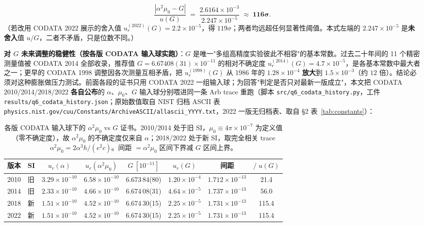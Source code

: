 \documentclass[12pt,a4paper]{article}
\begin{document}
\begin{equation}
  \frac{|\alpha^2\mu_0 - G|}{u(G)} \;=\; \frac{2.6164\times10^{-3}}{2.247\times10^{-5}} \;\approx\; \mathbf{116\sigma}.
\end{equation}
（若改用 CODATA 2022 展示的舍入值 $u_r^{(2022)}(G)=2.2\times10^{-5}$，得 $119\sigma$；两者均远超任何显著性阈值。本式左端的 $2.247\times10^{-5}$ 是\textbf{未舍入}值 $u/G$，二者不矛盾，只是位数不同。）

\textbf{对 $G$ 未来调整的稳健性（按各版 CODATA 输入球实跑）}：$G$ 是唯一"多组高精度实验彼此不相容"的基本常数。过去二十年间的 11 个精密测量值被 CODATA 2014 全部收录，推荐值 $G = 6.67408(31)\times10^{-11}$ 的相对不确定度 $u_r^{(2014)}(G) = 4.7\times10^{-5}$，是各基本常数中最大者之一\cite{li2020g}；更早的 CODATA 1998 调整因各次测量互相矛盾，把 $u_r^{(1998)}(G)$ 从 1986 年的 $1.28\times10^{-4}$ \textbf{放大}到 $1.5\times10^{-3}$（约 $12$ 倍）\cite{codata1998}。结论必须对这种膨胀做压力测试。前面各段的证书只用 CODATA 2022 一组输入球；为回答"判定是否只对最新一版成立"，本文把 CODATA 2010/2014/2018/2022 \textbf{各自公布}的 $\alpha$、$\mu_0$、$G$ 输入球分别喂进同一条 Arb trace 重跑（脚本 \texttt{src/q6\_\allowbreak{}codata\_\allowbreak{}history.py}，工件 \texttt{results/q6\_\allowbreak{}codata\_\allowbreak{}history.json}；原始数值取自 NIST 归档 ASCII 表 \texttt{physics.nist.gov/cuu/Constants/ArchiveASCII/allascii\_\allowbreak{}YYYY.txt}，2022 一版无归档表、取自 §2 表~\ref{tab:constants}）：

\begin{table}[h]
\centering
\caption{各版 CODATA 输入球下的 $\alpha^2\mu_0$ vs $G$ 证书。2010/2014 处于旧 SI，$\mu_0 \equiv 4\pi\times10^{-7}$ 为定义值（零不确定度），故 $\alpha^2\mu_0$ 的不确定度仅来自 $\alpha$；2018/2022 处于新 SI，取完全相关 trace $\alpha^2\mu_0 = 2\alpha^3h/(e^2c)$。间距 $=\alpha^2\mu_0$ 区间下界减 $G$ 区间上界。}
\label{tab:codata_history}
\footnotesize
\begin{tabular}{@{}llcccccc@{}}
\toprule
\textbf{版本} & \textbf{SI} & $u_r(\alpha)$ & $u_r(\alpha^2\mu_0)$ & $G\ [10^{-11}]$ & $u_r(G)$ & \textbf{间距} & $/\;u(G)$ \\
\midrule
2010 & 旧 & $3.29\times10^{-10}$ & $6.58\times10^{-10}$ & 6.673\,84(80) & $1.20\times10^{-4}$ & $1.712\times10^{-13}$ & 21.4 \\
2014 & 旧 & $2.33\times10^{-10}$ & $4.66\times10^{-10}$ & 6.674\,08(31) & $4.64\times10^{-5}$ & $1.737\times10^{-13}$ & 56.0 \\
2018 & 新 & $1.51\times10^{-10}$ & $4.52\times10^{-10}$ & 6.674\,30(15) & $2.25\times10^{-5}$ & $1.731\times10^{-13}$ & 115.4 \\
2022 & 新 & $1.51\times10^{-10}$ & $4.52\times10^{-10}$ & 6.674\,30(15) & $2.25\times10^{-5}$ & $1.731\times10^{-13}$ & 115.4 \\
\bottomrule
\end{tabular}
\end{table}
\end{document}
